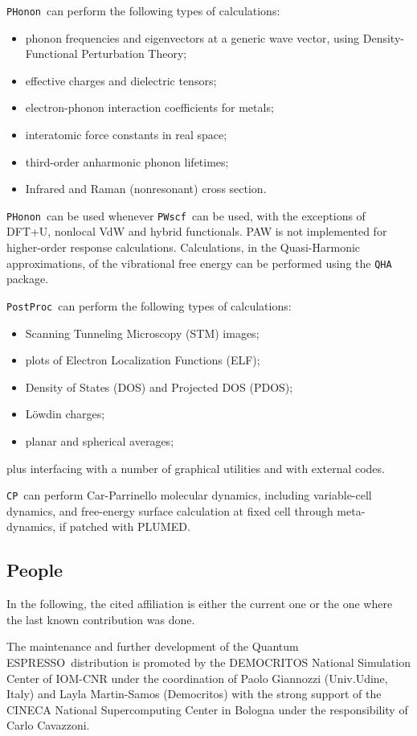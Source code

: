\documentclass[12pt,a4paper]{article}
\def\qe{{\sc Quantum ESPRESSO}}
\def\PWscf{\texttt{PWscf}}
\def\PHonon{\texttt{PHonon}}
\def\CP{\texttt{CP}}
\def\PostProc{\texttt{PostProc}}
\begin{document}
\PHonon\ can perform the following types of calculations:
\begin{itemize}
  \item phonon frequencies and eigenvectors at a generic wave vector,
  using Density-Functional Perturbation Theory;
  \item effective charges and dielectric tensors;
  \item electron-phonon interaction coefficients for metals;
  \item interatomic force constants in real space;
  \item third-order anharmonic phonon lifetimes;
  \item Infrared and Raman (nonresonant) cross section.
\end{itemize}
\PHonon\ can be used whenever \PWscf\ can be 
used, with the exceptions of DFT+U, nonlocal VdW and hybrid functionals. 
PAW is not implemented for higher-order response calculations.
Calculations, in the Quasi-Harmonic approximations, of the vibrational 
free energy can be performed using the \texttt{QHA}  package.

\PostProc\ can perform the following types of calculations:
\begin{itemize}
  \item Scanning Tunneling Microscopy (STM) images;
  \item plots of Electron Localization Functions (ELF);
  \item Density of States (DOS) and Projected DOS (PDOS);
  \item L\"owdin charges;
  \item planar and spherical averages;
\end{itemize}
plus interfacing with a number of graphical utilities and with 
external codes.

\CP\ can perform Car-Parrinello molecular dynamics, including
variable-cell dynamics, and free-energy surface calculation at 
fixed cell through meta-dynamics, if patched with PLUMED.

\subsection{People}

In the following, the cited affiliation is either the current one 
or the one where the last known contribution was done.

The maintenance and further development of the \qe\ distribution
is promoted by the DEMOCRITOS National Simulation Center 
of IOM-CNR under the coordination of
Paolo Giannozzi (Univ.Udine, Italy) and Layla Martin-Samos 
(Democritos) with the strong support
of the CINECA National Supercomputing Center in Bologna under 
the responsibility of Carlo Cavazzoni.
\end{document}
